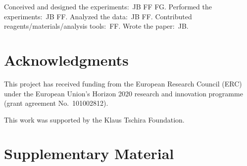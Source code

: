 \documentclass[
  letterpaper,
  DIV=11,
  numbers=noendperiod]{scrartcl}
\begin{document}
Conceived and designed the experiments:~JB FF FG. Performed the
experiments:~JB FF. Analyzed the data:~JB FF. Contributed
reagents/materials/analysis tools:~FF. Wrote the paper:~JB.

\hypertarget{acknowledgments}{%
\section{Acknowledgments}\label{acknowledgments}}

This project has received funding from the European Research Council
(ERC) under the European Union's Horizon 2020 research and innovation
programme (grant agreement No.~101002812).

This work was supported by the Klaus Tschira Foundation.

\hypertarget{supplementary-material}{%
\section{Supplementary Material}\label{supplementary-material}}
\end{document}
